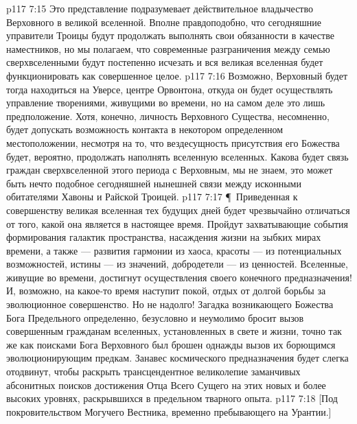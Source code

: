 \vs p117 7:15 Это представление подразумевает действительное владычество Верховного в великой вселенной. Вполне правдоподобно, что сегодняшние управители Троицы будут продолжать выполнять свои обязанности в качестве наместников, но мы полагаем, что современные разграничения между семью сверхвселенными будут постепенно исчезать и вся великая вселенная будет функционировать как совершенное целое.
\vs p117 7:16 Возможно, Верховный будет тогда находиться на Уверсе, центре Орвонтона, откуда он будет осуществлять управление творениями, живущими во времени, но на самом деле это лишь предположение. Хотя, конечно, личность Верховного Существа, несомненно, будет допускать возможность контакта в некотором определенном местоположении, несмотря на то, что вездесущность присутствия его Божества будет, вероятно, продолжать наполнять вселенную вселенных. Какова будет связь граждан сверхвселенной этого периода с Верховным, мы не знаем, это может быть нечто подобное сегодняшней нынешней связи между исконными обитателями Хавоны и Райской Троицей.
\vs p117 7:17 \P\ Приведенная к совершенству великая вселенная тех будущих дней будет чрезвычайно отличаться от того, какой она является в настоящее время. Пройдут захватывающие события формирования галактик пространства, насаждения жизни на зыбких мирах времени, а также --- развития гармонии из хаоса, красоты --- из потенциальных возможностей, истины --- из значений, добродетели --- из ценностей. Вселенные, живущие во времени, достигнут осуществления своего конечного предназначения! И, возможно, на какое\hyp{}то время наступит покой, отдых от долгой борьбы за эволюционное совершенство. Но не надолго! Загадка возникающего Божества Бога Предельного определенно, безусловно и неумолимо бросит вызов совершенным гражданам вселенных, установленных в свете и жизни, точно так же как поисками Бога Верховного был брошен однажды вызов их борющимся эволюционирующим предкам. Занавес космического предназначения будет слегка отодвинут, чтобы раскрыть трансцендентное великолепие заманчивых абсонитных поисков достижения Отца Всего Сущего на этих новых и более высоких уровнях, раскрывшихся в предельном тварного опыта.
\vs p117 7:18 [Под покровительством Могучего Вестника, временно пребывающего на Урантии.]
